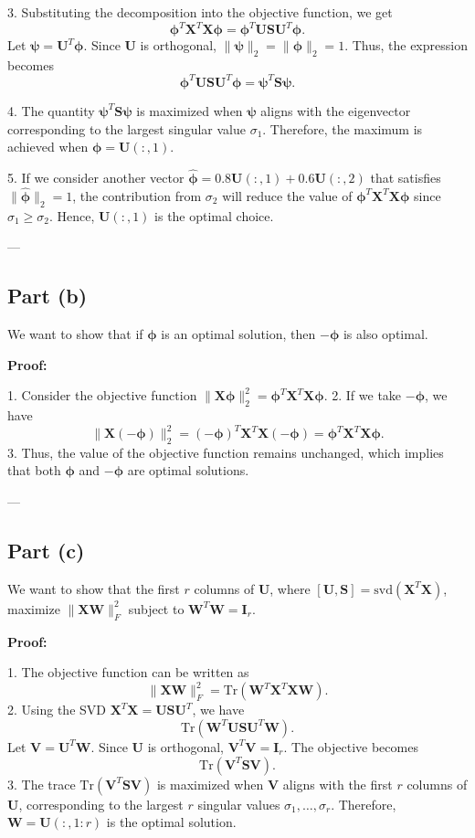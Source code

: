 \documentclass[11pt]{article}
\newcommand{\mtx}[1]{\mathbf{#1}}
\def \mI {\mtx{I}}
\def \mU {\mtx{U}}
\def \mS {\mtx{S}}
\def \mV {\mtx{V}}
\def \mW {\mtx{W}}
\def \mX {\mtx{X}}
\begin{document}
3. Substituting the decomposition into the objective function, we get
   \[
   \bm{\phi}^T \mX^T \mX \bm{\phi} = \bm{\phi}^T \mU \mS \mU^T \bm{\phi}.
   \]
   Let $\bm{\psi} = \mU^T \bm{\phi}$. Since $\mU$ is orthogonal, $\|\bm{\psi}\|_2 = \|\bm{\phi}\|_2 = 1$. Thus, the expression becomes
   \[
   \bm{\phi}^T \mU \mS \mU^T \bm{\phi} = \bm{\psi}^T \mS \bm{\psi}.
   \]
   
4. The quantity $\bm{\psi}^T \mS \bm{\psi}$ is maximized when $\bm{\psi}$ aligns with the eigenvector corresponding to the largest singular value $\sigma_1$. Therefore, the maximum is achieved when $\bm{\phi} = \mU(:, 1)$.

5. If we consider another vector $\hat{\bm{\phi}} = 0.8 \mU(:, 1) + 0.6 \mU(:, 2)$ that satisfies $\|\hat{\bm{\phi}}\|_2 = 1$, the contribution from $\sigma_2$ will reduce the value of $\bm{\phi}^T \mX^T \mX \bm{\phi}$ since $\sigma_1 \geq \sigma_2$. Hence, $\mU(:, 1)$ is the optimal choice.

---

\subsection*{Part (b)}
We want to show that if $\bm{\phi}$ is an optimal solution, then $-\bm{\phi}$ is also optimal.

\textbf{Proof:}

1. Consider the objective function $\|\mX \bm{\phi}\|_2^2 = \bm{\phi}^T \mX^T \mX \bm{\phi}$.
2. If we take $-\bm{\phi}$, we have
   \[
   \|\mX (-\bm{\phi})\|_2^2 = (-\bm{\phi})^T \mX^T \mX (-\bm{\phi}) = \bm{\phi}^T \mX^T \mX \bm{\phi}.
   \]
3. Thus, the value of the objective function remains unchanged, which implies that both $\bm{\phi}$ and $-\bm{\phi}$ are optimal solutions.

---

\subsection*{Part (c)}
We want to show that the first $r$ columns of $\mU$, where $[\mU, \mS] = \text{svd}(\mX^T \mX)$, maximize $\|\mX \bm{\mW}\|_F^2$ subject to $\bm{\mW}^T \bm{\mW} = \mI_r$.

\textbf{Proof:}

1. The objective function can be written as
   \[
   \|\mX \bm{\mW}\|_F^2 = \text{Tr}(\bm{\mW}^T \mX^T \mX \bm{\mW}).
   \]
2. Using the SVD $\mX^T \mX = \mU \mS \mU^T$, we have
   \[
   \text{Tr}(\bm{\mW}^T \mU \mS \mU^T \bm{\mW}).
   \]
   Let $\bm{\mV} = \mU^T \bm{\mW}$. Since $\mU$ is orthogonal, $\bm{\mV}^T \bm{\mV} = \mI_r$. The objective becomes
   \[
   \text{Tr}(\bm{\mV}^T \mS \bm{\mV}).
   \]
3. The trace $\text{Tr}(\bm{\mV}^T \mS \bm{\mV})$ is maximized when $\bm{\mV}$ aligns with the first $r$ columns of $\mU$, corresponding to the largest $r$ singular values $\sigma_1, \dots, \sigma_r$. Therefore, $\bm{\mW} = \mU(:, 1:r)$ is the optimal solution.
\end{document}

